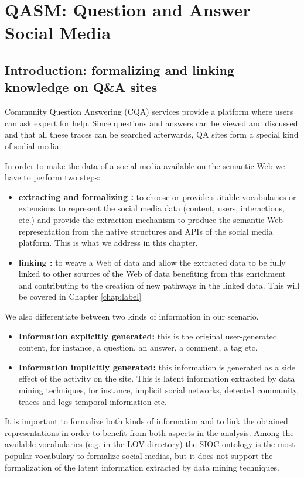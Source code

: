 \chapter{QASM: Question and Answer Social Media}
\doublespacing
\label{chap:qasm}
\minitoc

\section{Introduction: formalizing and linking knowledge on Q\&A sites}
Community Question Answering (CQA) services provide a platform where users can ask expert for help. Since questions and answers can be viewed and discussed and that all these traces can be searched afterwards, QA sites form a special kind of sodial media.


In order to make the data of a social media available on the semantic Web we have to perform two steps:

\begin{itemize}
\item \textbf{extracting and formalizing :} to choose or provide suitable vocabularies or extensions to represent the social media data (content, users, interactions, etc.) and provide the extraction mechanism to produce the semantic Web representation from the native structures and APIs of the social media platform. This is what we address in this chapter.
\item \textbf{linking :} to weave a Web of data and allow the extracted data to be fully linked to other sources of the Web of data benefiting from this enrichment and contributing to the creation of new pathways in the linked data. This will be covered in Chapter \ref{chap:label}
\end{itemize}

We also differentiate between two kinds of information in our scenario.
\begin{itemize}
\item \textbf{Information explicitly generated:} this is the original user-generated content, for instance, a question, an answer, a comment, a tag etc.
\item \textbf{Information implicitly generated:}  this information is generated as a side effect of the activity on the site. This is latent information extracted by data mining techniques, for instance, implicit social networks, detected community, traces and logs temporal information etc.
\end{itemize}
It is important to formalize both kinds of information and to link the obtained representations in order to benefit from both aspects in the analysis. Among the available vocabularies (e.g. in the LOV directory) the SIOC %
ontology is the most popular vocabulary to formalize social medias, but it does not support the formalization of the latent information extracted by data mining techniques.

